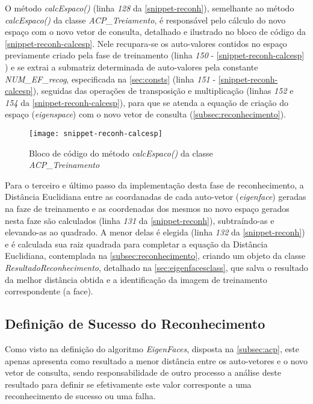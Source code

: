 O método \textit{calcEspaco()} (linha \textit{128} da \autoref{snippet-reconh}), semelhante ao método \textit{calcEspaco()} da classe \textit{ACP\_Treiamento}, é responsável pelo cálculo do novo espaço com o novo vetor de consulta, detalhado e ilustrado no bloco de código da \autoref{snippet-reconh-calcesp}. Nele recupara-se os auto-valores contidos no espaço previamente criado pela fase de treinamento (linha \textit{150} - \autoref{snippet-reconh-calcesp} ) e se extrai a submatriz determinada de auto-valores pela constante \textit{NUM\_EF\_recog}, especificada na \autoref{sec:consts} (linha \textit{151} - \autoref{snippet-reconh-calcesp}), seguidas das operações de transposição e multiplicação (linhas \textit{152} e \textit{154} da \autoref{snippet-reconh-calcesp}), para que se atenda a equação de criação do espaço (\textit{eigenspace}) com o novo vetor de consulta (\autoref{subsec:reconhecimento}).

\begin{figure}[h]
	\centering
	\texttt{[image: snippet-reconh-calcesp]}
	\caption{Bloco de código do método \textit{calcEspaco()} da classe \textit{ACP\_Treinamento}}
	\label{snippet-reconh-calcesp}
\end{figure}


Para o terceiro e último passo da implementação desta fase de reconhecimento, a Distância Euclidiana entre as coordanadas de cada auto-vetor (\textit{eigenface}) geradas na faze de treinamento e as coordenadas dos mesmos no novo espaço gerados nesta faze são calculados (linha \textit{131} da \autoref{snippet-reconh}), subtraíndo-as e elevando-as ao quadrado. A menor delas é elegida (linha \textit{132} da \autoref{snippet-reconh}) e é calculada sua raiz quadrada para completar a equação da Distância Euclidiana, contemplada na \autoref{subsec:reconhecimento}, criando um objeto da classe \textit{ResultadoReconhecimento}, detalhado na \autoref{sec:eigenfacesclass}, que salva o resultado da melhor distância obtida e a identificação da imagem de treinamento correspondente (a face).


\subsection{Definição de Sucesso do Reconhecimento}\label{sec:defsucregoc}

Como visto na definição do algoritmo \textit{EigenFaces}, disposta na \autoref{subsec:acp}, este apenas apresenta como resultado a menor distância entre os auto-vetores e o novo vetor de consulta, sendo responsabilidade de outro processo a análise deste resultado para definir se efetivamente este valor corresponte a uma reconhecimento de sucesso ou uma falha.

